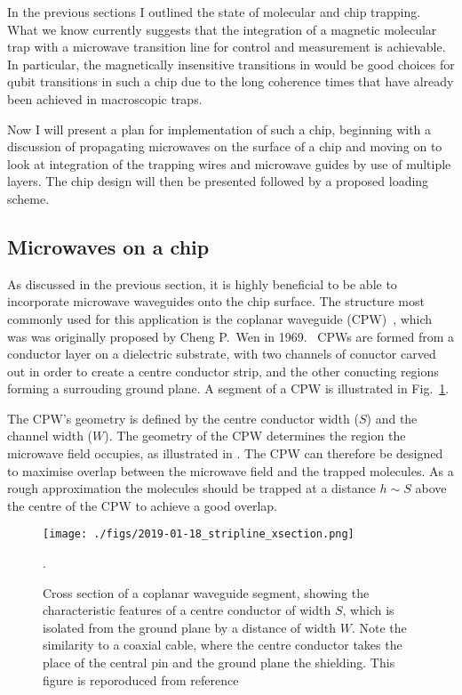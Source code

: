 In the previous sections I outlined the state of molecular and chip trapping.
What we know currently suggests that the integration of a magnetic molecular
trap with a microwave transition line for control and measurement is
achievable. In particular, the magnetically insensitive transitions in 
would be good choices for qubit transitions in such a chip due to the long
coherence times that have already been achieved in macroscopic traps.~\cite{}

Now I will present a plan for implementation of such a chip, beginning with a
discussion of propagating microwaves on the surface of a chip and moving on to
look at integration of the trapping wires and microwave guides by use of
multiple layers. The chip design will then be presented followed by a proposed
loading scheme.

\subsection{Microwaves on a chip}

As discussed in the previous section, it is highly beneficial to be able to
incorporate microwave waveguides onto the chip surface. The structure most
commonly used for this application is the coplanar waveguide (CPW)~\cite{},
which was was originally proposed by Cheng P.~Wen in 1969.~\cite{1127105} CPWs
are formed from a conductor layer on a dielectric substrate, with two channels
of conuctor carved out in order to create a centre conductor strip, and the
other conucting regions forming a surrouding ground plane.  A segment of a CPW
is illustrated in Fig.~\ref{experiment:fig:CPWxsec}.

The CPW's geometry is defined by the centre conductor width ($S$) and the
channel width ($W$). The geometry of the CPW determines the region the microwave
field occupies, as illustrated in . The CPW
can therefore be designed to maximise overlap between the microwave field and
the trapped molecules. As a rough approximation the molecules should be trapped
at a distance $h\sim S$ above the centre of the CPW to achieve a good
overlap.~\cite{Boehi2009} 

\begin{figure}
  \texttt{[image: ./figs/2019-01-18\_stripline\_xsection.png]}
  \caption{
    Cross section of a coplanar waveguide segment, showing the characteristic
    features of a centre conductor of width $S$, which is isolated from the
    ground plane by a distance of width $W$. Note the similarity to a coaxial
    cable, where the centre conductor takes the place of the central pin and the
    ground plane the shielding. This figure is reporoduced from
    reference~\cite{Simons2004}}.
  \label{experiment:fig:CPWxsec}
\end{figure}


